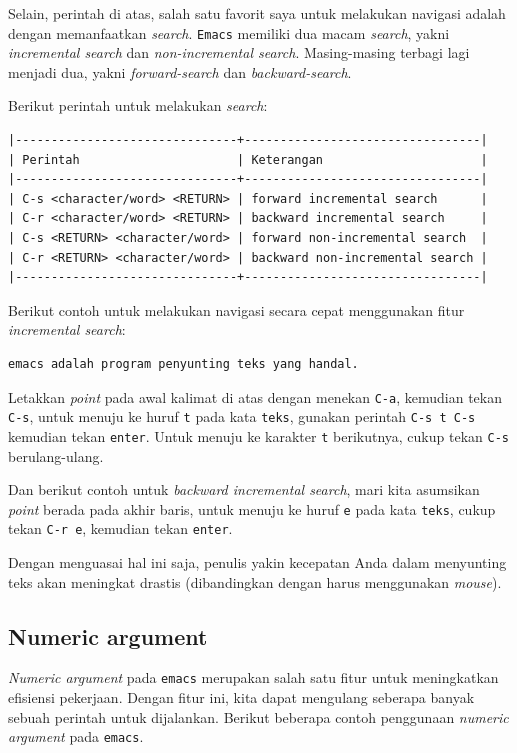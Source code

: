 \documentclass{article}
\begin{document}
Selain, perintah di atas, salah satu favorit saya untuk melakukan navigasi 
adalah dengan memanfaatkan \emph{search}. \verb=Emacs= memiliki dua 
macam \emph{search}, yakni \emph{incremental search} dan 
\emph{non-incremental search}. Masing-masing terbagi lagi
menjadi dua, yakni \emph{forward-search} dan \emph{backward-search}.

Berikut perintah untuk melakukan \emph{search}:

\begin{verbatim}
|-------------------------------+---------------------------------|
| Perintah                      | Keterangan                      |
|-------------------------------+---------------------------------|
| C-s <character/word> <RETURN> | forward incremental search      |
| C-r <character/word> <RETURN> | backward incremental search     |
| C-s <RETURN> <character/word> | forward non-incremental search  |
| C-r <RETURN> <character/word> | backward non-incremental search |
|-------------------------------+---------------------------------|
\end{verbatim}

Berikut contoh untuk melakukan navigasi secara cepat menggunakan fitur
\emph{incremental search}:

\begin{verbatim}
emacs adalah program penyunting teks yang handal.
\end{verbatim}

Letakkan \emph{point} pada awal kalimat di atas dengan menekan \verb=C-a=, 
kemudian tekan \verb=C-s=, untuk menuju ke huruf \verb=t= pada kata 
\verb=teks=, gunakan perintah \verb=C-s t C-s= kemudian tekan \verb=enter=. 
Untuk menuju ke karakter \verb=t= berikutnya, cukup tekan \verb=C-s=
berulang-ulang.

Dan berikut contoh untuk \emph{backward incremental search}, mari kita
asumsikan \emph{point} berada pada akhir baris, untuk menuju ke huruf 
\verb=e= pada kata \verb=teks=, cukup tekan \verb=C-r e=, kemudian tekan 
\verb=enter=.

Dengan menguasai hal ini saja, penulis yakin kecepatan Anda dalam menyunting 
teks akan meningkat drastis (dibandingkan dengan harus menggunakan 
\emph{mouse}).

\subsection{Numeric argument}
\emph{Numeric argument} pada \verb=emacs= merupakan salah satu fitur
untuk meningkatkan efisiensi pekerjaan. Dengan fitur ini, kita dapat 
mengulang seberapa banyak sebuah perintah untuk dijalankan. Berikut 
beberapa contoh penggunaan \emph{numeric argument} pada \verb=emacs=.
\end{document}
